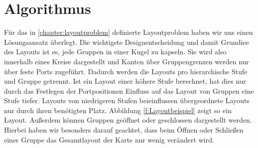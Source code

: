 \chapter{Algorithmus} %



Für das in \autoref{chapter:layoutproblem} definierte Layoutproblem haben wir uns einen Lösungsansatz überlegt.
Die wichtigste Designentscheidung und damit Grundiee des Layouts ist es, jede Gruppen in einer Kugel zu kapseln. Sie wird also innerhalb eines Kreise dargestellt und Kanten über Gruppengrenzen werden nur über feste Ports zugeführt.
Dadurch werden die Layouts pro hierarchische Stufe und Gruppe getrennt. 
Ist ein Layout einer höhere Stufe berechnet, hat dies nur durch das Festlegen der Portpositionen Einfluss auf das Layout von Gruppen eine Stufe tiefer.  Layouts von niedrigeren Stufen beieinflussen übergeordnete Layouts nur durch ihren benötigten Platz.
Abbildung \ref{f:Layoutbeispiel} zeigt so ein Layout.
Außerdem können Gruppen geöffnet oder geschlossen dargestellt werden. 
Hierbei haben wir besonders darauf geachtet, dass beim Öffnen oder Schließen einer Gruppe das Gesamtlayout der Karte nur wenig verändert wird.


